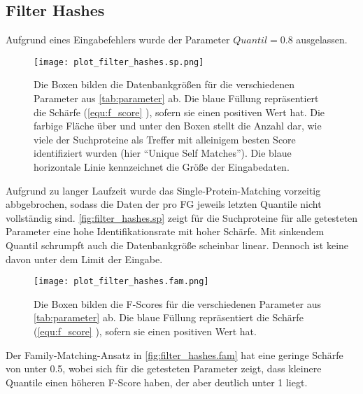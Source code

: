    \subsection{Filter Hashes} %
        \label{sub:filter_results}
        Aufgrund eines Eingabefehlers wurde der Parameter $Quantil=0.8$ ausgelassen.

        \begin{figure}[H]
            \centering
            \texttt{[image: plot\_filter\_hashes.sp.png]}
            \caption[Single-Protein-Matching ]{Die Boxen bilden die Datenbankgrößen für die verschiedenen Parameter aus \autoref{tab:parameter} ab. Die blaue Füllung repräsentiert die Schärfe (\autoref{equ:f_score} ), sofern sie einen positiven Wert hat. Die farbige Fläche über und unter den Boxen stellt die Anzahl dar, wie viele der Suchproteine als Treffer mit alleinigem besten Score identifiziert wurden (hier ``Unique Self Matches''). Die blaue horizontale Linie kennzeichnet die Größe der Eingabedaten.}
            \label{fig:filter_hashes.sp}
        \end{figure}

        Aufgrund zu langer Laufzeit wurde das Single-Protein-Matching vorzeitig abbgebrochen, sodass die Daten der pro \ac{FG} jeweils letzten Quantile nicht vollständig sind. \autoref{fig:filter_hashes.sp} zeigt für die Suchproteine für alle getesteten Parameter eine hohe Identifikationsrate mit hoher Schärfe. Mit sinkendem Quantil schrumpft auch die Datenbankgröße scheinbar linear. Dennoch ist keine davon unter dem Limit der Eingabe.

        \begin{figure}[H]
            \centering
            \texttt{[image: plot\_filter\_hashes.fam.png]}
            \caption[Family-Matching ]{Die Boxen bilden die F-Scores für die verschiedenen Parameter aus \autoref{tab:parameter} ab. Die blaue Füllung repräsentiert die Schärfe (\autoref{equ:f_score} ), sofern sie einen positiven Wert hat.}
            \label{fig:filter_hashes.fam}
        \end{figure}

        Der Family-Matching-Ansatz in \autoref{fig:filter_hashes.fam} hat eine geringe Schärfe von unter 0.5, wobei sich für die getesteten Parameter zeigt, dass kleinere Quantile einen höheren F-Score haben, der aber deutlich unter 1 liegt.


